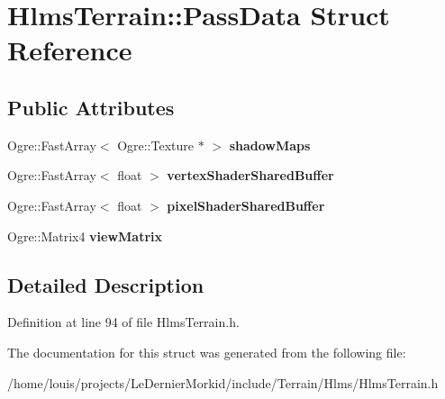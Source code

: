 \hypertarget{struct_hlms_terrain_1_1_pass_data}{}\section{Hlms\+Terrain\+:\+:Pass\+Data Struct Reference}
\label{struct_hlms_terrain_1_1_pass_data}
\subsection*{Public Attributes}
\begin{DoxyCompactItemize}
\item 
\mbox{\label{struct_hlms_terrain_1_1_pass_data_ac1e7191cdffc43b7a8adf70203a28f19}} 
Ogre\+::\+Fast\+Array$<$ Ogre\+::\+Texture $\ast$ $>$ {\bfseries shadow\+Maps}
\item 
\mbox{\label{struct_hlms_terrain_1_1_pass_data_a27dbe70984eb2d8085dd247bd04b0b98}} 
Ogre\+::\+Fast\+Array$<$ float $>$ {\bfseries vertex\+Shader\+Shared\+Buffer}
\item 
\mbox{\label{struct_hlms_terrain_1_1_pass_data_adfd3b35c0c10cbfe52dca4fb6a216515}} 
Ogre\+::\+Fast\+Array$<$ float $>$ {\bfseries pixel\+Shader\+Shared\+Buffer}
\item 
\mbox{\label{struct_hlms_terrain_1_1_pass_data_a698f2e686954dbc8a427cbde28a0d7f1}} 
Ogre\+::\+Matrix4 {\bfseries view\+Matrix}
\end{DoxyCompactItemize}


\subsection{Detailed Description}


Definition at line 94 of file Hlms\+Terrain.\+h.



The documentation for this struct was generated from the following file\+:\begin{DoxyCompactItemize}
\item 
/home/louis/projects/\+Le\+Dernier\+Morkid/include/\+Terrain/\+Hlms/Hlms\+Terrain.\+h\end{DoxyCompactItemize}

